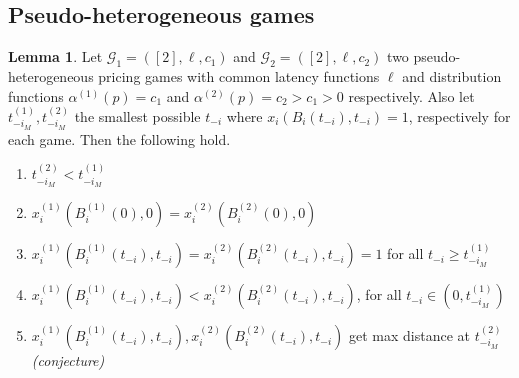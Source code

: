 \documentclass[10pt,a4paper]{book}
\newcommand{\Gm}{\mathcal{G}}
\theoremstyle{definition}
\newtheorem{lemma}[definition]{Lemma}
\theoremstyle{comment}
\begin{document}
\subsection*{Pseudo-heterogeneous games}

\begin{lemma}
	\label{lemma:a_fixed_t_iM}
	Let $\Gm_1 = ([2], \ell, c_1)$ and $\Gm_2 = ([2], \ell, c_2)$ two pseudo-heterogeneous pricing games with common latency functions $\ell$ and distribution functions $\alpha^{(1)}(p) = c_1$ and $\alpha^{(2)}(p) = c_2 > c_1 > 0$ respectively.
	Also let $t_{-i_M}^{(1)}, t_{-i_M}^{(2)}$ the smallest possible $t_{-i}$ where $x_i(B_i(t_{-i}), t_{-i}) = 1$, respectively for each game.
	Then the following hold.
	\begin{enumerate}[$(i)$]
		\item $t_{-i_M}^{(2)} < t_{-i_M}^{(1)}$
		\item $x_i^{(1)}(B_i^{(1)}(0), 0) = x_i^{(2)}(B_i^{(2)}(0), 0)$
		\item $x_i^{(1)}(B_i^{(1)}(t_{-i}), t_{-i}) = x_i^{(2)}(B_i^{(2)}(t_{-i}), t_{-i}) = 1$ for all $t_{-i} \ge t_{-i_M}^{(1)}$
		\item $x_i^{(1)}(B_i^{(1)}(t_{-i}), t_{-i}) < x_i^{(2)}(B_i^{(2)}(t_{-i}), t_{-i})$, for all $t_{-i} \in (0, t_{-i_M}^{(1)})$
		\item $x_i^{(1)}(B_i^{(1)}(t_{-i}), t_{-i}), x_i^{(2)}(B_i^{(2)}(t_{-i}), t_{-i})$ get max distance at $t_{-i_M}^{(2)}$ \\
		\textit{(conjecture)}
	\end{enumerate}
\end{lemma}
\end{document}
